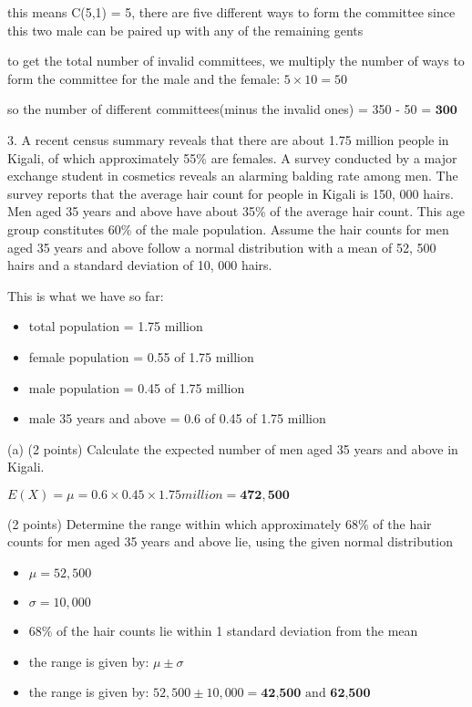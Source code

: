 \documentclass{article}
\begin{document}
this means C(5,1) = 5, there are five different ways to form the committee since this two male can be paired up with any of the remaining gents\newline

to get the total number of invalid committees, we multiply the number of ways to form the committee for the male and the female: \(5 \times 10 = 50\)\newline

so the number of different committees(minus the invalid ones) = 350 - 50 = \(\mathbf{300}\)\newline



3. A recent census summary reveals that there are about 1.75 million people in Kigali, of which approximately 55\% are females. A survey conducted by a major exchange student in cosmetics reveals an alarming balding rate among men. The survey reports that the average hair count for people in Kigali is 150, 000 hairs. Men aged 35 years and above have about 35\% of the average
hair count. This age group constitutes 60\% of the male population. Assume the hair counts for men aged 35 years and above follow a normal distribution with a mean of 52, 500 hairs and a standard deviation of 10, 000 hairs.

This is what we have so far:

\begin{itemize}
    \item total population = 1.75 million
    \item female population = 0.55 of 1.75 million
    \item male population = 0.45 of 1.75 million
    \item male 35 years and above = 0.6 of 0.45 of 1.75 million
\end{itemize}


(a) (2 points) Calculate the expected number of men aged 35 years and above in Kigali.

\(E(X) = \mu = 0.6 \times 0.45 \times 1.75 million = \mathbf{472,500}\) \newline

(2 points) Determine the range within which approximately 68\% of the hair counts for men aged 35 years and above lie, using the given normal distribution

\begin{itemize}
    \item \(\mu = 52,500\)
    \item \(\sigma = 10,000\)
    \item 68\% of the hair counts lie within 1 standard deviation from the mean
    \item the range is given by: \(\mu \pm \sigma\)
    \item the range is given by: \(52,500 \pm 10,000 = \textbf{42,500} \text{ and } \textbf{62,500}\)
\end{itemize}
\end{document}
